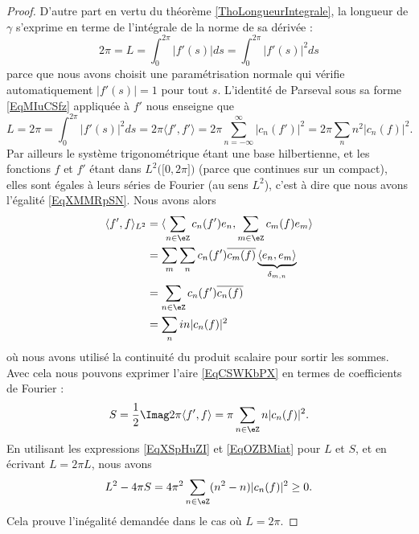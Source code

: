 \begin{proof}
    D'autre part en vertu du théorème \ref{ThoLongueurIntegrale}, la longueur de \( \gamma\) s'exprime en terme de l'intégrale de la norme de sa dérivée :
    \begin{equation}
        2\pi=L=\int_0^{2\pi}| f'(s) |ds=\int_0^{2\pi}| f'(s) |^2ds
    \end{equation}
    parce que nous avons choisit une paramétrisation normale qui vérifie automatiquement \( | f'(s) |=1\) pour tout \( s\). L'identité de Parseval sous sa forme \eqref{EqMIuCSfz} appliquée à \( f'\) nous enseigne que
    \begin{equation}        \label{EqXSpHuZI}
        L=2\pi=\int_0^{2\pi}| f'(s) |^2ds=2\pi\langle f', f'\rangle=2\pi\sum_{n=-\infty}^{\infty}| c_n(f') |^2=2\pi\sum_nn^2| c_n(f) |^2.
    \end{equation}
    Par ailleurs le système trigonométrique étant une base hilbertienne, et les fonctions \( f\) et \( f'\) étant dans \( L^2\big( \mathopen[ 0 , 2\pi \mathclose] \big)\) (parce que continues sur un compact), elles sont égales à leurs séries de Fourier (au sens \( L^2\)), c'est à dire que nous avons l'égalité \eqref{EqXMMRpSN}. Nous avons alors
    \begin{subequations}
        \begin{align}
            \langle f', f\rangle_{L^2} &=\langle \sum_{n\in \eZ}c_n(f')e_n, \sum_{m\in \eZ}c_m(f)e_m\rangle \\
            &=\sum_m\sum_nc_n(f')\overline{ c_m(f) }\underbrace{\langle e_n, e_m\rangle }_{\delta_{m,n}}\\
            &=\sum_{n\in \eZ}c_n(f')\overline{ c_n(f) }\\
            &=\sum_nin| c_n(f) |^2
        \end{align}
    \end{subequations}
    où nous avons utilisé la continuité du produit scalaire pour sortir les sommes. Avec cela nous pouvons exprimer l'aire \eqref{EqCSWKbPX} en termes de coefficients de Fourier :
    \begin{equation}    \label{EqOZBMiat}
        S=\frac{ 1 }{2}\Imag2\pi\langle f', f\rangle =\pi\sum_{n\in \eZ}n| c_n(f) |^2.
    \end{equation}
    En utilisant les expressions \eqref{EqXSpHuZI} et \eqref{EqOZBMiat} pour \( L\) et \( S\), et en écrivant \( L=2\pi L\), nous avons
    \begin{equation}
        L^2-4\pi S=4\pi^2\sum_{n\in \eZ}(n^2-n)| c_n(f) |^2\geq 0.
    \end{equation}
    Cela prouve l'inégalité demandée dans le cas où \( L=2\pi\).


\end{proof}
